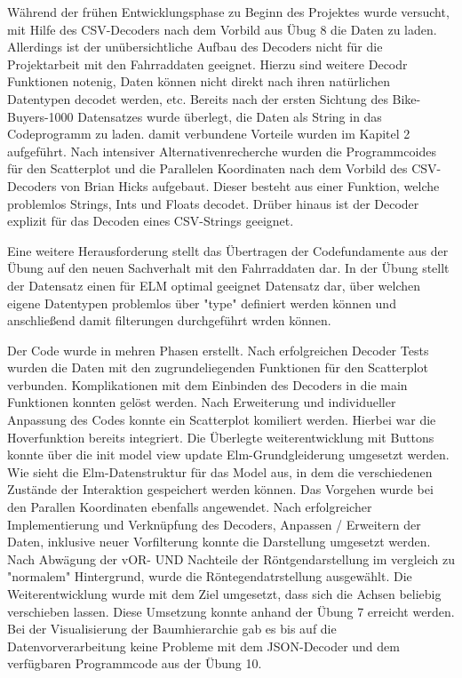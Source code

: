 \documentclass[usegeometry=true]{scrartcl}
\begin{document}
Während der frühen Entwicklungsphase zu Beginn des Projektes wurde versucht, mit Hilfe des CSV-Decoders nach dem Vorbild aus Übug 8 die Daten zu laden. Allerdings ist der unübersichtliche Aufbau des Decoders nicht für die Projektarbeit mit den Fahrraddaten geeignet. Hierzu sind weitere Decodr Funktionen notenig, Daten können nicht direkt nach ihren natürlichen Datentypen decodet werden, etc. Bereits nach der ersten Sichtung des Bike-Buyers-1000 Datensatzes wurde überlegt, die Daten als String in das Codeprogramm zu laden. damit verbundene Vorteile wurden im Kapitel 2 aufgeführt. 
Nach intensiver Alternativenrecherche wurden die Programmcoides für den Scatterplot und die Parallelen Koordinaten nach dem Vorbild des CSV-Decoders von Brian Hicks aufgebaut. Dieser besteht aus einer Funktion, welche problemlos Strings, Ints und Floats decodet. Drüber hinaus ist der Decoder explizit für das Decoden eines CSV-Strings geeignet. 

Eine weitere Herausforderung stellt das Übertragen der Codefundamente aus der Übung auf den neuen Sachverhalt mit den Fahrraddaten dar. In der Übung stellt der Datensatz einen für ELM optimal geeignet Datensatz dar, über welchen eigene Datentypen problemlos über "type" definiert werden können und anschließend damit filterungen durchgeführt wrden können. 


Der Code wurde in mehren Phasen erstellt. Nach erfolgreichen Decoder Tests wurden die Daten mit den zugrundeliegenden Funktionen für den Scatterplot verbunden. Komplikationen mit dem Einbinden des Decoders in die main Funktionen konnten gelöst werden. Nach Erweiterung und individueller Anpassung des Codes konnte ein Scatterplot komiliert werden. Hierbei war die Hoverfunktion bereits integriert. Die Überlegte weiterentwicklung mit Buttons konnte über die init model view update Elm-Grundgleiderung umgesetzt werden. 
Wie sieht die Elm-Datenstruktur für das Model aus, in dem die verschiedenen Zustände der Interaktion gespeichert werden können.
Das Vorgehen wurde bei den Parallen Koordinaten ebenfalls angewendet. Nach erfolgreicher Implementierung und Verknüpfung des Decoders, Anpassen / Erweitern der Daten, inklusive neuer Vorfilterung konnte die Darstellung umgesetzt werden. Nach Abwägung der vOR- UND Nachteile der Röntgendarstellung im vergleich zu "normalem" Hintergrund, wurde die Röntegendatrstellung ausgewählt. Die Weiterentwicklung wurde mit dem Ziel umgesetzt, dass sich die Achsen beliebig verschieben lassen. Diese Umsetzung konnte anhand der Übung 7 erreicht werden.
Bei der Visualisierung der Baumhierarchie gab es bis auf die Datenvorverarbeitung keine Probleme mit dem JSON-Decoder und dem verfügbaren Programmcode aus der Übung 10. 
\end{document}
